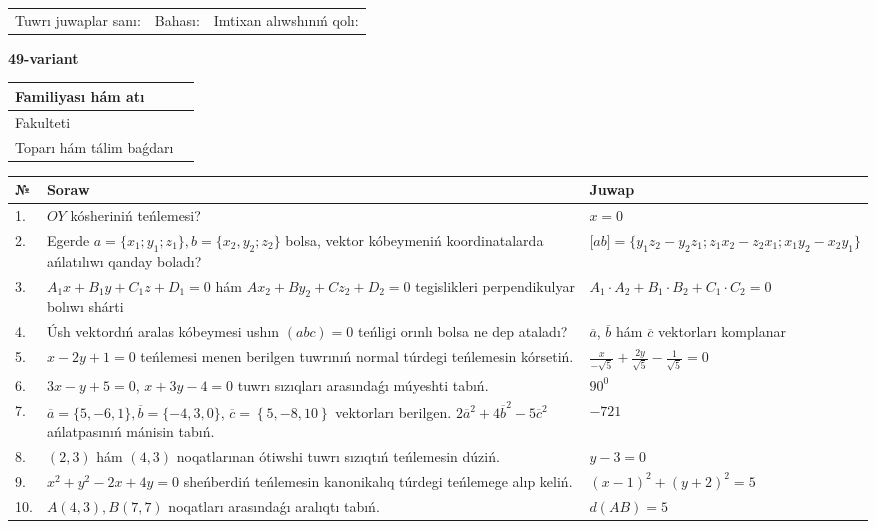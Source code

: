 \documentclass{article}
\begin{document}
\vspace{1cm}

\begin{tabular}{lll}
Tuwrı juwaplar sanı: \underline{\hspace{1.5cm}} & 
Bahası: \underline{\hspace{1.5cm}} & 
Imtixan alıwshınıń qolı: \underline{\hspace{2cm}} \\
\end{tabular}

\egroup

\newpage


\textbf{49-variant}\\

\bgroup
\def\arraystretch{1.6} %

\begin{tabular}{|m{5.7cm}|m{9.5cm}|}
\hline
Familiyası hám atı & \\
\hline
Fakulteti  & \\
\hline
Toparı hám tálim baǵdarı  & \\
\hline
\end{tabular}

\vspace{1cm}

\begin{tabular}{|m{0.7cm}|m{10cm}|m{4cm}|}
\hline
№ & Soraw & Juwap \\
\hline
1. & $OY$ kósheriniń teńlemesi? & $x=0$ \\
\hline
2. & Egerde $a=\{ x_1; y_1; z_1\}, b=\{ x_2, y_2; z_2\}$ bolsa, vektor kóbeymeniń koordinatalarda ańlatılıwı qanday boladı? &  $\lbrack ab\rbrack=\{y_1z_2-y_2z_1; z_1x_2-z_2x_1; x_1y_2-x_2y_1\}$ \\
\hline
3. & $A_1x+B_1y+C_1z+D_1=0$ hám $Ax_2+By_2+Cz_2+D_2=0$ tegislikleri perpendikulyar bolıwı shárti & $A_1\cdot A_2+B_1\cdot B_2+C_1\cdot C_2=0$ \\
\hline
4. & Úsh vektordıń aralas kóbeymesi ushın $(abc)=0$ teńligi orınlı bolsa ne dep ataladı? & $\overline{a}$, $\overline{b}$ hám $\overline{c}$ vektorları komplanar \\
\hline
5. & $x-2y+1=0$ teńlemesi menen berilgen tuwrınıń normal túrdegi teńlemesin kórsetiń. & $\frac{x}{- \sqrt{5}}+\frac{2y}{\sqrt{5}}-\frac{1}{\sqrt{5}}=0$ \\
\hline
6. & $3x-y+5=0$, $x+3y-4=0$ tuwrı sızıqları arasındaǵı múyeshti tabıń. & $90^{0}$ \\
\hline
7. & $\overline{a}=\{5,-6, 1 \}, \overline{b}=\{-4, 3, 0 \} $, $\overline{c}=\left\{ 5,-8, 10 \right\}$ vektorları berilgen. $2{\overline{a}}^{2}+4{\overline{b}}^{2}-5{\overline{c}}^{2}$ ańlatpasınıń mánisin tabıń. & $-721$ \\
\hline
8. & $(2, 3)$ hám $(4, 3)$ noqatlarınan ótiwshi tuwrı sızıqtıń teńlemesin dúziń. & $ y-3=0$ \\
\hline
9. & $x^{2}+y^{2}-2x+4y=0$ sheńberdiń teńlemesin kanonikalıq túrdegi teńlemege alıp keliń. & $(x-1)^{2}+(y+2)^{2}=5$ \\
\hline
10. & $A(4, 3), B(7, 7)$ noqatları arasındaǵı aralıqtı tabıń. & $d(AB)=5$ \\
\hline
\end{tabular}
\end{document}
